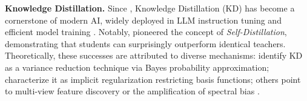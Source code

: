 \documentclass{article}
\theoremstyle{definition}
\theoremstyle{definition}
\theoremstyle{plain}
\theoremstyle{plain}
\theoremstyle{plain}
\theoremstyle{plain}
\theoremstyle{plain}
\begin{document}

\textbf{Knowledge Distillation.}
Since \citet{hinton2015distillingknowledgeneuralnetwork}, Knowledge Distillation (KD) has become a cornerstone of modern AI, widely deployed in LLM instruction tuning and efficient model training \citep{wang2023selfinstructaligninglanguagemodels, abdin2024phi3technicalreporthighly, Guo_2025}. 
Notably, \citet{furlanello2018bornneuralnetworks} pioneered the concept of \emph{Self-Distillation}, demonstrating that students can surprisingly outperform identical teachers.
Theoretically, these successes are attributed to diverse mechanisms: \citet{menon2021statistical} identify KD as a variance reduction technique via Bayes probability approximation; \citet{mobahi2020selfdistillationamplifiesregularizationhilbert} characterize it as implicit regularization restricting basis functions; others point to multi-view feature discovery \citep{allenzhu2023understandingensembleknowledgedistillation} or the amplification of spectral bias \citep{nagarajan2024studentteacherdeviationsdistillationdoes}.
\end{document}
